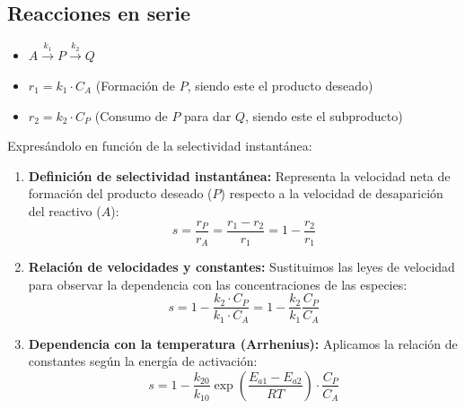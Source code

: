\subsection{Reacciones en serie}

\begin{itemize}
  \item $A \xrightarrow{k_1} P \xrightarrow{k_2} Q$
  \item $r_1 = k_1 \cdot C_A$ (Formación de $P$, siendo este el producto deseado)
  \item $r_2 = k_2 \cdot C_P$ (Consumo de $P$ para dar $Q$, siendo este el subproducto)
\end{itemize}

\noindent Expresándolo en función de la selectividad instantánea:

\begin{enumerate}
  \item \textbf{Definición de selectividad instantánea:}
        Representa la velocidad neta de formación del producto deseado ($P$) respecto a la velocidad de desaparición del reactivo ($A$):
        \begin{equation}
          s = \frac{r_P}{r_A} = \frac{r_1 - r_2}{r_1} = 1 - \frac{r_2}{r_1}
        \end{equation}

  \item \textbf{Relación de velocidades y constantes:}
        Sustituimos las leyes de velocidad para observar la dependencia con las concentraciones de las especies:
        \begin{equation}
          s = 1 - \frac{k_2 \cdot C_P}{k_1 \cdot C_A} = 1 - \frac{k_2}{k_1} \frac{C_P}{C_A}
        \end{equation}

  \item \textbf{Dependencia con la temperatura (Arrhenius):}
        Aplicamos la relación de constantes según la energía de activación:
        \begin{equation}
          s = 1 - \frac{k_{20}}{k_{10}} \exp \left( \frac{E_{a1} - E_{a2}}{RT} \right) \cdot \frac{C_P}{C_A}
        \end{equation}
\end{enumerate}

